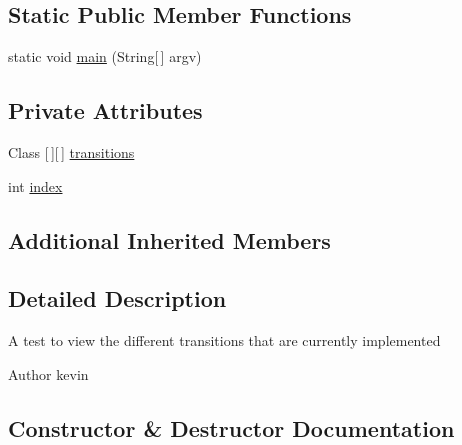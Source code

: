 \subsection*{Static Public Member Functions}
\begin{DoxyCompactItemize}
\item 
static void \mbox{\hyperlink{classorg_1_1newdawn_1_1slick_1_1tests_1_1_transition_test_acf364163c9f1de4c97c74af9d7c18db2}{main}} (String\mbox{[}$\,$\mbox{]} argv)
\end{DoxyCompactItemize}
\subsection*{Private Attributes}
\begin{DoxyCompactItemize}
\item 
Class \mbox{[}$\,$\mbox{]}\mbox{[}$\,$\mbox{]} \mbox{\hyperlink{classorg_1_1newdawn_1_1slick_1_1tests_1_1_transition_test_a9dcb9c54401d0e66c4393216f5c85b27}{transitions}}
\item 
int \mbox{\hyperlink{classorg_1_1newdawn_1_1slick_1_1tests_1_1_transition_test_afabf315fd18817326974d85af5163dfe}{index}}
\end{DoxyCompactItemize}
\subsection*{Additional Inherited Members}


\subsection{Detailed Description}
A test to view the different transitions that are currently implemented

\begin{DoxyAuthor}{Author}
kevin 
\end{DoxyAuthor}


\subsection{Constructor \& Destructor Documentation}
\mbox{\label{classorg_1_1newdawn_1_1slick_1_1tests_1_1_transition_test_ae2a4a1049ab878b413fea99c428a8c28}} 
